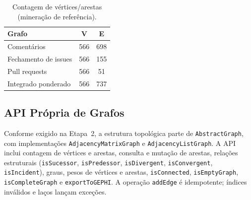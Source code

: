 \documentclass[12pt]{article}
\begin{document}
\begin{table}[H]
\centering
\caption{Contagem de vértices/arestas (mineração de referência).}
\vspace{0.2cm}
\begin{tabular}{|l|c|c|}
\hline
\textbf{Grafo} & \textbf{V} & \textbf{E} \\
\hline Comentários & 566 & 698 \\
\hline Fechamento de issues & 566 & 155 \\
\hline Pull requests & 566 & 51 \\
\hline Integrado ponderado & 566 & 737 \\
\hline
\end{tabular}
\label{tab:contagem_grafos}
\end{table}

\subsection{API Própria de Grafos}

Conforme exigido na Etapa~2, a estrutura topológica parte de \texttt{AbstractGraph}, com implementações \texttt{AdjacencyMatrixGraph} e \texttt{AdjacencyListGraph}. A API inclui contagem de vértices e arestas, consulta e mutação de arestas, relações estruturais (\texttt{isSucessor}, \texttt{isPredessor}, \texttt{isDivergent}, \texttt{isConvergent}, \texttt{isIncident}), graus, pesos de vértices e arestas, \texttt{isConnected}, \texttt{isEmptyGraph}, \texttt{isCompleteGraph} e \texttt{exportToGEPHI}. A operação \texttt{addEdge} é idempotente; índices inválidos e laços lançam exceções.
\end{document}
